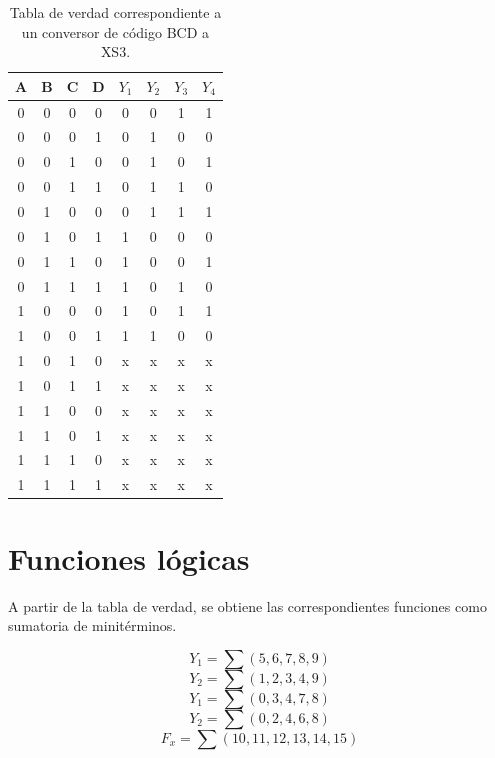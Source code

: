 \documentclass{informeutn}
\begin{document}
    \begin{table}[h]
        \centering
        \begin{tabular}{cccc|cccc}
            A & B & C & D & $Y_1$ & $Y_2$ & $Y_3$ & $Y_4$ \\
            \hline
            0 & 0 & 0 & 0 & 0 & 0 & 1 & 1 \\
            0 & 0 & 0 & 1 & 0 & 1 & 0 & 0 \\
            0 & 0 & 1 & 0 & 0 & 1 & 0 & 1 \\
            0 & 0 & 1 & 1 & 0 & 1 & 1 & 0 \\
            0 & 1 & 0 & 0 & 0 & 1 & 1 & 1 \\
            0 & 1 & 0 & 1 & 1 & 0 & 0 & 0 \\
            0 & 1 & 1 & 0 & 1 & 0 & 0 & 1 \\
            0 & 1 & 1 & 1 & 1 & 0 & 1 & 0 \\
            1 & 0 & 0 & 0 & 1 & 0 & 1 & 1 \\
            1 & 0 & 0 & 1 & 1 & 1 & 0 & 0 \\
            1 & 0 & 1 & 0 & x & x & x & x \\
            1 & 0 & 1 & 1 & x & x & x & x \\
            1 & 1 & 0 & 0 & x & x & x & x \\
            1 & 1 & 0 & 1 & x & x & x & x \\
            1 & 1 & 1 & 0 & x & x & x & x \\
            1 & 1 & 1 & 1 & x & x & x & x \\
        \end{tabular}
        \caption{Tabla de verdad correspondiente a un conversor de código BCD a XS3.}
        \label{tab:example_label}
    \end{table}

    \section{Funciones lógicas}
    A partir de la tabla de verdad, se obtiene las correspondientes funciones como sumatoria de minitérminos.
    
    \begin{equation*}
        Y_1 = \sum(5,6,7,8,9)
    \end{equation*}
    \begin{equation*}
        Y_2 = \sum(1,2,3,4,9)
    \end{equation*}
    \begin{equation*}
        Y_1 = \sum(0,3,4,7,8)
    \end{equation*}
    \begin{equation*}
        Y_2 = \sum(0,2,4,6,8)
    \end{equation*}
    \begin{equation*}
        F_x = \sum(10,11,12,13,14,15)
    \end{equation*}
\end{document}
